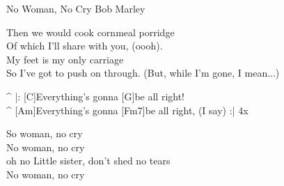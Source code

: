 \begin{song}{No Woman, No Cry }{Bob Marley}
\begin{guitar}
Then we would cook cornmeal porridge\\
Of which I'll share with you, (oooh).\\
My feet is my only carriage\\
So I've got to push on through. (But, while I'm gone, I mean...)\\
\end{guitar}

\begin{guitar}
^ |: [C]Everything's gonna [G]be all right!\\
^ [Am]Everything's gonna [Fm7]be all right, (I say) :| 4x\\
\end{guitar}


\begin{guitar}
So woman, no cry\\
No  woman,  no cry\\
oh no Little sister,  don't shed no tears\\
No  woman,  no cry\\
\end{guitar}
\end{song}
